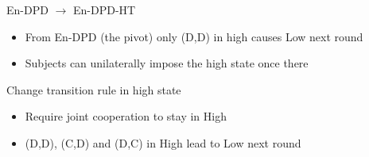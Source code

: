 \documentclass{beamer}
\begin{document}
\begin{frame}{En-DPD $\rightarrow$ En-DPD-HT}
\begin{card}
\begin{itemize}
\item From En-DPD (the pivot) only (D,D) in high causes Low next round
\item Subjects can unilaterally impose the high state once there
\end{itemize}
\end{card}
\begin{card}[Manipulation 2]
 Change transition rule in high state
    \begin{itemize}
    \item Require joint cooperation to stay in High
    \item (D,D), (C,D) and (D,C) in High lead to Low next round
    \end{itemize}
\end{card}
\end{frame}
\end{document}
